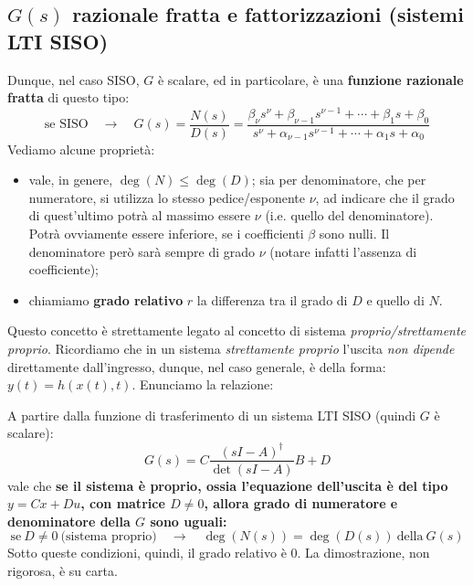 \subsection{$G(s)$ razionale fratta e fattorizzazioni (sistemi LTI SISO)}
Dunque, nel caso SISO, $G$ è scalare, ed in particolare, è una \textbf{funzione razionale fratta} di questo tipo:
\begin{equation}
\label{eq:trasf_polinomi}
\textrm{se SISO} \quad \rightarrow \quad G(s) = \frac{N(s)}{D(s)} = \frac{\beta_\nu s^\nu + \beta_{\nu-1} s^{\nu -1} + \cdots + \beta_1 s + \beta_0}{s^\nu + \alpha_{\nu - 1}s^{\nu -1} + \cdots + \alpha_1 s + \alpha_0} 
\end{equation}
Vediamo alcune proprietà:
\begin{itemize}
\item vale, in genere, $\deg(N) \leq \deg(D)$; sia per denominatore, che per numeratore, si utilizza lo stesso pedice/esponente $\nu$, ad indicare che il grado di quest'ultimo potrà al massimo essere $\nu$ (i.e. quello del denominatore). Potrà ovviamente essere inferiore, se i coefficienti $\beta$ sono nulli. Il denominatore però sarà sempre di grado $\nu$ (notare infatti l'assenza di coefficiente);  
\item chiamiamo \textbf{grado relativo} $r$ la differenza tra il grado di $D$ e quello di $N$.
\end{itemize}
Questo concetto è strettamente legato al concetto di sistema \textit{proprio/strettamente proprio}. Ricordiamo che in un sistema \textit{strettamente proprio} l'uscita \textit{non dipende} direttamente dall'ingresso, dunque, nel caso generale, è della forma: $y(t) = h(x(t),t)$.  Enunciamo la relazione:
\begin{defin}{}{}
A partire dalla funzione di trasferimento di un sistema LTI SISO (quindi $G$ è scalare):
\begin{equation*}
G(s) = C \frac{(sI-A)^\dagger}{\det(sI-A)}B+D
\end{equation*}
vale che \textbf{se il sistema è proprio, ossia l'equazione dell'uscita è del tipo $y = Cx+Du$, con matrice $D \neq 0$, allora grado di numeratore e denominatore della $G$ sono uguali:}
\begin{equation}
\textrm{se} \ D \neq 0 \ \textrm{(sistema proprio)} \quad \rightarrow \quad \deg(N(s)) = \deg(D(s)) \ \textrm{della} \ G(s)
\end{equation}
Sotto queste condizioni, quindi, il grado relativo è 0. La dimostrazione, non rigorosa, è su carta.
\end{defin}
